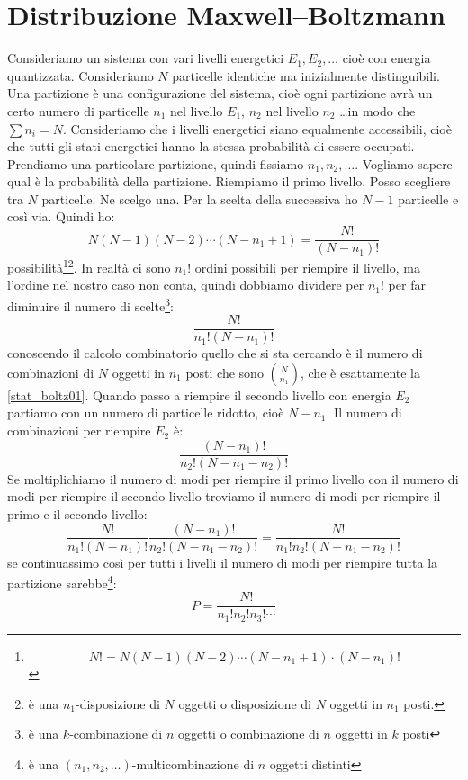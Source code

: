 \section{Distribuzione Maxwell--Boltzmann}
Consideriamo un sistema con vari livelli energetici $E_1, E_2, \ldots$ cioè con energia quantizzata. Consideriamo $N$ particelle identiche ma inizialmente distinguibili. Una partizione è una configurazione del sistema, cioè ogni partizione avrà un certo numero di particelle $n_1$ nel livello $E_1$, $n_2$ nel livello $n_2$ \ldots in modo che $\sum n_i=N$. Consideriamo che i livelli energetici siano equalmente accessibili, cioè che tutti gli stati energetici hanno la stessa probabilità di essere occupati. Prendiamo una particolare partizione, quindi fissiamo $n_1, n_2, \ldots$. Vogliamo sapere qual è la probabilità della partizione. Riempiamo il primo livello. Posso scegliere tra $N$ particelle. Ne scelgo una. Per la scelta della successiva ho $N-1$ particelle e così via. Quindi ho:
\begin{equation}
	N(N-1)(N-2)\cdots(N-n_1+1)=\frac{N!}{\left(N-n_1\right)!}
\end{equation}
possibilità\footnote{\[
		N!=N(N-1)(N-2)\cdots(N-n_1+1)\cdot(N-n_1)!
	\]
}\footnote{è una $n_1$-disposizione di $N$ oggetti o disposizione di $N$ oggetti in $n_1$ posti.}. In realtà ci sono $n_1!$ ordini possibili per riempire il livello, ma l'ordine nel nostro caso non conta, quindi dobbiamo dividere per $n_1!$ per far diminuire il numero di scelte\footnote{è una $k$-combinazione di $n$ oggetti o combinazione di $n$ oggetti in $k$ posti}:
\begin{equation}
	\frac{N!}{n_1!(N-n_1)!}
	\label{stat_boltz01}
\end{equation}
conoscendo il calcolo combinatorio quello che si sta cercando è il numero di combinazioni di $N$ oggetti in $n_1$ posti che sono $\binom{N}{n_1}$, che è esattamente la \eqref{stat_boltz01}. Quando passo a riempire il secondo livello con energia $E_2$ partiamo con un numero di particelle ridotto, cioè $N-n_1$. Il numero di combinazioni per riempire $E_2$ è:
\begin{equation}
	\frac{(N-n_1)!}{n_2!(N-n_1-n_2)!}
\end{equation}
Se moltiplichiamo il numero di modi per riempire il primo livello con il numero di modi per riempire il secondo livello troviamo il numero di modi per riempire il primo e il secondo livello:
\begin{equation}
	\frac{N!}{n_1!(N-n_1)!}\frac{(N-n_1)!}{n_2!(N-n_1-n_2)!}=\frac{N!}{n_1!n_2!(N-n_1-n_2)!}
\end{equation}
se continuassimo così per tutti i livelli il numero di modi per riempire tutta la partizione sarebbe\footnote{è una $(n_1,n_2,\ldots)$-multicombinazione di $n$ oggetti distinti}:
\begin{equation}
	P=\frac{N!}{n_1!n_2!n_3!\cdots}
	\label{stat_001}
\end{equation}
